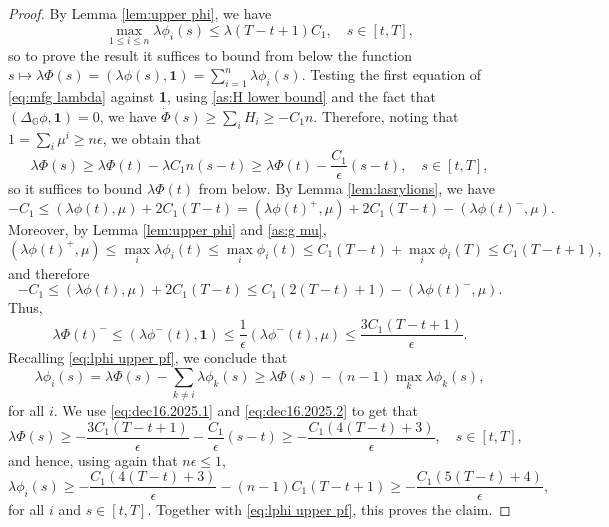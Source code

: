 \documentclass[10pt,a4paper]{amsart}
\def\G{\mathbb{G}}
\begin{document}
\begin{proof} By Lemma \ref{lem:upper phi}, we have
\begin{equation} \label{eq:lphi upper pf}
\max_{1\leq i\leq n} \lambda \phi_i(s) \leq \lambda (T-t+1)C_1, \quad s\in [t,T],
\end{equation}
so to prove the result it suffices to bound from below the function $s \mapsto \lambda\Phi(s)=(\lambda \phi(s),\textbf{1})=\sum_{i=1}^{n}\lambda\phi_i(s).$
Testing the first equation of \eqref{eq:mfg lambda} against \textbf{1}, using \eqref{as:H lower bound} and the fact that $(\Delta_{\G}\phi,\textbf{1})=0$, we have
$\dot \Phi(s)\geq\sum_{i}H_i \geq -C_1n.$
Therefore, noting that $1=\sum_{i}\mu^i\geq n\epsilon$, we obtain that
\begin{equation} \label{eq:dec16.2025.1}
\lambda \Phi(s)\geq \lambda \Phi(t)-\lambda C_1n(s-t)\geq \lambda \Phi(t)-\frac{C_1 }{\epsilon}(s-t),\quad s\in [t,T],
\end{equation}
so it suffices to bound $\lambda \Phi(t)$ from below. By Lemma \ref{lem:lasrylions}, we have
\begin{equation}
    -C_1 \leq (\lambda \phi(t),\mu)+2C_1(T-t) = (\lambda \phi(t)^+,\mu)+2C_1(T-t) -(\lambda\phi(t)^-,\mu).
\end{equation}
Moreover, by Lemma \ref{lem:upper phi} and \eqref{as:g mu},
\[
(\lambda \phi(t)^+,\mu)\le \max_{i}\lambda \phi_i(t)\le \max_i \phi_i(t)\le C_1(T-t)+\max_i\phi_i(T)\le C_1(T-t+1),
\]
and therefore
\begin{equation}
    -C_1 \leq (\lambda \phi(t),\mu)+2C_1(T-t) \leq C_1(2(T-t)+1) -(\lambda \phi(t)^-,\mu).
\end{equation}
Thus,
\begin{equation}\label{eq:dec16.2025.2}
    \lambda \Phi(t)^-\leq (\lambda \phi^-(t),\textbf{1})\leq \frac{1}{\epsilon}(\lambda \phi^-(t),\mu)\leq\frac{3C_1(T-t+1)}{\epsilon}.
\end{equation}
Recalling \eqref{eq:lphi upper pf}, we conclude that
\[
\lambda \phi_i(s)=  \lambda\Phi(s)-\sum_{k \not =i } \lambda \phi_k(s)
\geq \lambda\Phi(s) - (n-1)\max_k\lambda\phi_k(s),
\]
for all $i$. We use \eqref{eq:dec16.2025.1} and \eqref{eq:dec16.2025.2} to get that
\[
\lambda\Phi(s)\ge -\frac{3C_1(T-t+1)}{\epsilon}-\frac{C_1}{\epsilon}(s-t)\ge -\frac{C_1(4(T-t)+3)}{\epsilon}, \quad s\in[t,T],
\]
and hence, using again that $n\epsilon\le 1$,
\[
\lambda \phi_i(s)\ge -\frac{C_1(4(T-t)+3)}{\epsilon}-(n-1)C_1(T-t+1)\ge -\frac{C_1(5(T-t)+4)}{\epsilon},
\]
for all $i$ and $s \in [t,T].$ Together with \eqref{eq:lphi upper pf}, this proves the claim.
\end{proof}
\end{document}

